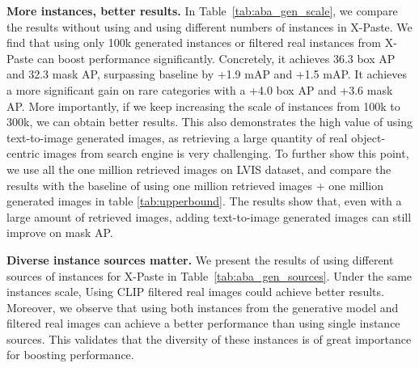 \documentclass{article}
\begin{document}
\noindent \textbf{More instances, better results.} In Table~\ref{tab:aba_gen_scale}, we compare the results without using and using different numbers of instances in X-Paste. We find that using only 100k generated instances or filtered real instances from X-Paste can boost performance significantly. Concretely, it achieves 36.3 box AP and 32.3 mask AP, surpassing baseline by +1.9 mAP and +1.5 mAP. It achieves a more significant gain on rare categories with a +4.0 box AP and +3.6 mask AP. More importantly, if we keep increasing the scale of instances from 100k to 300k, we can obtain better results. This also demonstrates the high value of using text-to-image generated images, as retrieving a large quantity of real object-centric images from search engine is very challenging. To further show this point, we use all the one million retrieved images on LVIS dataset, and compare the results with the baseline of using one million retrieved images + one million generated images in table \ref{tab:upperbound}. The results show that, even with a large amount of retrieved images, adding text-to-image generated images can still improve  on mask AP.
\begin{table}[h]
  \small
  \centering
\caption{Comparison with directly use generated images as training data.}
\label{tab:upperbound}
\end{table}

\noindent \textbf{Diverse instance sources matter.} We present the results of using different sources of instances for X-Paste in Table~\ref{tab:aba_gen_sources}. Under the same instances scale, Using CLIP filtered real images could achieve better results. Moreover, we observe that using both instances from the generative model and filtered real images can achieve a better performance than using single instance sources. This validates that the diversity of these instances is of great importance for boosting performance.
\end{document}
